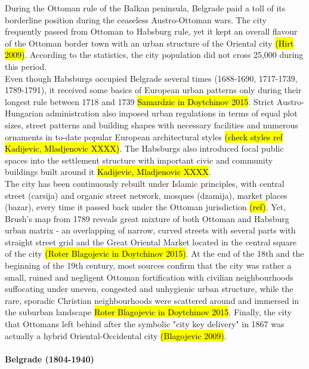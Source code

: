 \documentclass[11pt]{report}
\begin{document}
During the Ottoman rule of the Balkan peninsula, Belgrade paid a toll of its borderline position during the ceaseless Austro-Ottoman wars.
The city frequently passed from Ottoman to Habsburg rule, yet it kept an overall flavour of the Ottoman border town with an urban structure of the Oriental city \hl{(Hirt 2009)}.
According to the statistics, the city population did not cross 25,000 during this period.
\\
Even though Habsburgs occupied Belgrade several times
(1688-1690, 1717-1739, 1789-1791), it received some basics of European urban patterns only during their longest rule between 1718 and 1739 \hl{Samardzic in Doytchinov 2015}.
Strict Austro-Hungarian administration also imposed urban regulations in terms of equal plot sizes, street patterns and building shapes with necessary facilities and numerous ornaments in to-date popular European architectural styles \hl{(check styles ref Kadijevic, Mladjenovic XXXX)}.
The Habsburgs also introduced focal public spaces into the settlement structure with important civic and community buildings built around it \hl{Kadijevic, Mladjenovic XXXX}.
\\
The city has been continuously rebuilt under Islamic principles, with central street (carsija) and organic street network, mosques (dzamija), market places (bazar), every time it passed back under the Ottoman jurisdiction \hl{(ref)}.
Yet, Brush’s map from 1789 reveals great mixture of both Ottoman and Habsburg urban matrix - an overlapping of narrow, curved streets with several parts with straight street grid and the Great Oriental Market located in the central square of the city \hl{(Roter Blagojevic in Doytchinov 2015)}.
At the end of the 18th and the beginning of the 19th century, most sources confirm that the city was rather a small, ruined and negligent Ottoman fortification with civilian neighbourhoods suffocating under uneven, congested and unhygienic urban structure, while the rare, sporadic Christian neighbourhoods were scattered around and immersed in the suburban landscape \hl{Roter Blagojevic in Doytchinov 2015}.
Finally, the city that Ottomans left behind after the symbolic "city key delivery" in 1867 was actually a hybrid Oriental-Occidental city \hl{(Blagojevic 2009)}.

\paragraph{Belgrade (1804-1940)}
\end{document}

